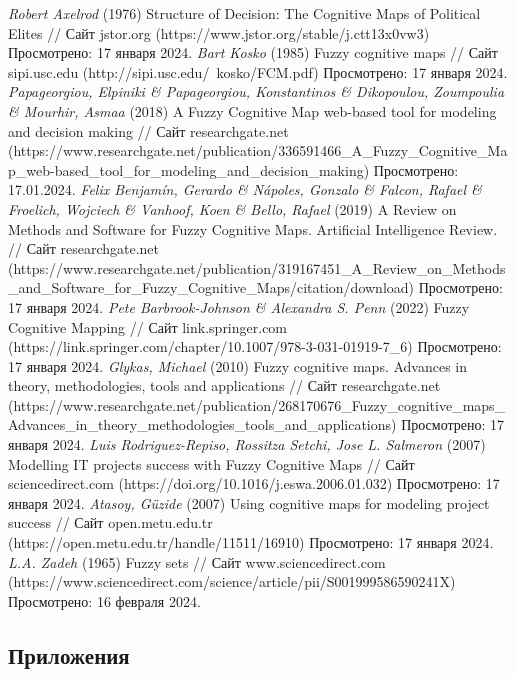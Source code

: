 \documentclass{article}
\begin{document}
\begin{thebibliography}{}
         \textit{Robert Axelrod} (1976) Structure of Decision: The Cognitive Maps of Political Elites // Сайт jstor.org (https://www.jstor.org/stable/j.ctt13x0vw3) Просмотрено: 17 января 2024.
         \textit{Bart Kosko} (1985) Fuzzy cognitive maps // Сайт sipi.usc.edu (http://sipi.usc.edu/~kosko/FCM.pdf) Просмотрено: 17 января 2024.
         \textit{Papageorgiou, Elpiniki \& Papageorgiou, Konstantinos \& Dikopoulou, Zoumpoulia \& Mourhir, Asmaa} (2018) A Fuzzy Cognitive Map web-based tool for modeling and decision making // Сайт researchgate.net (https://www.researchgate.net/publication/336591466\_A\_Fuzzy\_Cognitive\_Map\_web-based\_tool\_for\_modeling\_and\_decision\_making) Просмотрено: 17.01.2024.
         \textit{Felix Benjamín, Gerardo \& Nápoles, Gonzalo \& Falcon, Rafael \& Froelich, Wojciech \& Vanhoof, Koen \& Bello, Rafael} (2019) A Review on Methods and Software for Fuzzy Cognitive Maps. Artificial Intelligence Review. // Сайт researchgate.net (https://www.researchgate.net/publication/319167451\_A\_Review\_on\_Methods\_and\_Software\_for\_Fuzzy\_Cognitive\_Maps/citation/download) Просмотрено: 17 января 2024.
         \textit{Pete Barbrook-Johnson \& Alexandra S. Penn} (2022) Fuzzy Cognitive Mapping // Сайт link.springer.com (https://link.springer.com/chapter/10.1007/978-3-031-01919-7\_6) Просмотрено: 17 января 2024.
         \textit{Glykas, Michael} (2010) Fuzzy cognitive maps. Advances in theory, methodologies, tools and applications // Сайт researchgate.net (https://www.researchgate.net/publication/268170676\_Fuzzy\_cognitive\_maps\_Advances\_in\_theory\_methodologies\_tools\_and\_applications) Просмотрено: 17 января 2024.
         \textit{Luis Rodriguez-Repiso, Rossitza Setchi, Jose L. Salmeron} (2007) Modelling IT projects success with Fuzzy Cognitive Maps // Сайт sciencedirect.com (https://doi.org/10.1016/j.eswa.2006.01.032) Просмотрено: 17 января 2024.
         \textit{Atasoy, Güzide} (2007) Using cognitive maps for modeling project success // Сайт open.metu.edu.tr (https://open.metu.edu.tr/handle/11511/16910) Просмотрено: 17 января 2024.
         \textit{L.A. Zadeh} (1965) Fuzzy sets // Сайт www.sciencedirect.com (https://www.sciencedirect.com/science/article/pii/S001999586590241X) Просмотрено: 16 февраля 2024.
    \end{thebibliography}
    \newpage
    \begin{center}
        \section*{Приложения}
    \end{center}
\end{document}
